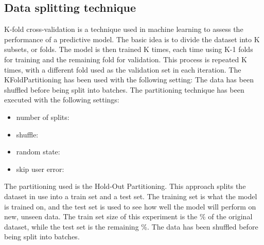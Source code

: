 \subsection{Data splitting technique}\label{subsec:partitioning}
K-fold cross-validation is a technique used in machine learning to assess the performance of a predictive model.
The basic idea is to divide the dataset into K subsets, or folds.
The model is then trained K times, each time using K-1 folds for training and the remaining fold for validation.
This process is repeated K times, with a different fold used as the validation set in each iteration.
\hfill\break
The KFoldPartitioning has been used with the following setting:
\hfill\break
{}
The data has been shuffled before being split into batches.
The partitioning technique has been executed with the following settings:
\begin{itemize}
    \item number of splits: 
    \item shuffle: 
    \item random state: 
    \item skip user error: 
\end{itemize}
\hfill\break

The partitioning used is the Hold-Out Partitioning.
This approach splits the dataset in use into a train set and a test set.
The training set is what the model is trained on, and the test set is used to see how
well the model will perform on new, unseen data.
\hfill\break
The train set size of this experiment is the \%
of the original dataset, while the test set is the remaining \%.
\hfill\break
{}
The data has been shuffled before being split into batches.
\hfill\break



